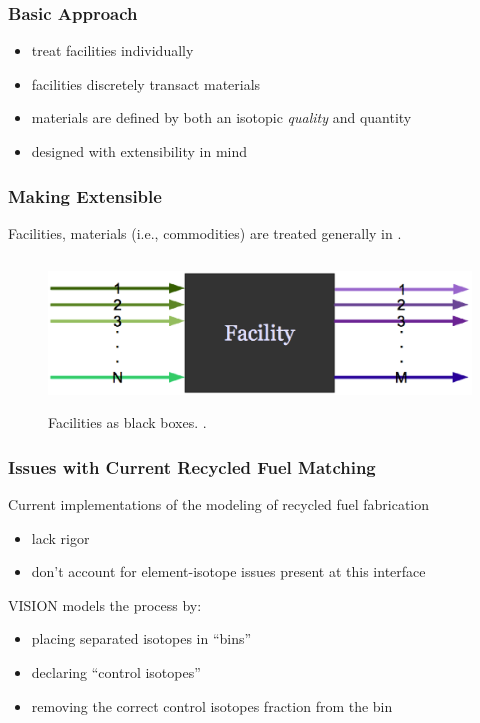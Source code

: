 \begin{frame}[ctb!]
  \frametitle{Basic \Cyclus Approach}

  \begin{itemize}
    \item treat facilities individually
    \item facilities discretely transact materials
    \item materials are defined by both an isotopic \textit{quality} and
      quantity
    \item designed with extensibility in mind
  \end{itemize}

\end{frame}

\begin{frame}[ctb!]
  \frametitle{Making \Cyclus Extensible}
  
  Facilities, materials (i.e., commodities) are treated generally in \Cyclus.

  \begin{figure}
    \includegraphics[height=4cm]{./images/facs.eps}
    \caption{Facilities as black boxes. \cite{cyclus2012}.}
    \label{fig:facs}  
  \end{figure}

\end{frame}

\begin{frame}[ctb!]
  \frametitle{Issues with Current Recycled Fuel Matching}
  
  Current implementations of the modeling of recycled fuel fabrication
  \begin{itemize}
    \item lack rigor
    \item don't account for element-isotope issues present at this interface
  \end{itemize}
  
  \vspace{0.2cm}

  VISION models the process by:
  \begin{itemize}
    \item placing separated isotopes in ``bins''
    \item declaring ``control isotopes''
    \item removing the correct control isotopes fraction from the bin
  \end{itemize}
  
\end{frame}

